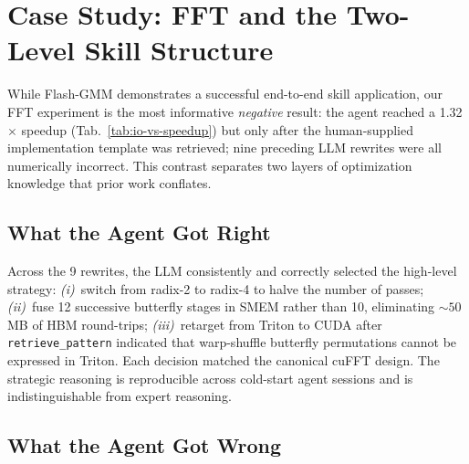 \documentclass[sigconf,nonacm]{acmart}
\begin{document}
\section{Case Study: FFT and the Two-Level Skill Structure}
\label{sec:fft-case}

While Flash-GMM demonstrates a successful end-to-end skill
application, our FFT experiment is the most informative
\emph{negative} result: the agent reached a 1.32$\times$
speedup (Tab.~\ref{tab:io-vs-speedup}) but only after the
human-supplied implementation template was retrieved; nine
preceding LLM rewrites were all numerically incorrect.
This contrast separates two layers of optimization knowledge that
prior work conflates.

\subsection{What the Agent Got Right}

Across the 9 rewrites, the LLM consistently and correctly
selected the high-level strategy:
\emph{(i)}~switch from radix-2 to radix-4 to halve the number of
passes;
\emph{(ii)}~fuse 12 successive butterfly stages in SMEM rather
than 10, eliminating $\sim\!50\,$MB of HBM round-trips;
\emph{(iii)}~retarget from Triton to CUDA after
\texttt{retrieve\_pattern} indicated that warp-shuffle butterfly
permutations cannot be expressed in Triton.
Each decision matched the canonical cuFFT design. The strategic
reasoning is reproducible across cold-start agent sessions and is
indistinguishable from expert reasoning.

\subsection{What the Agent Got Wrong}
\end{document}
